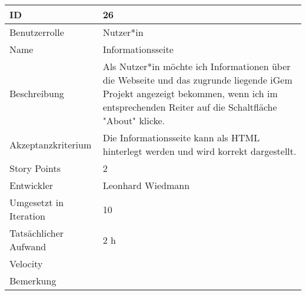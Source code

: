 \begin{tabularx}{\textwidth}{|p{}|X|}
	\hline
	ID & 26\\
	\hline
	Benutzerrolle & Nutzer*in\\
	\hline
	Name & Informationsseite\\
	\hline
	Beschreibung & Als Nutzer*in möchte ich Informationen über die Webseite und das zugrunde liegende iGem Projekt angezeigt bekommen, wenn ich im entsprechenden Reiter auf die Schaltfläche "About" klicke.\\
	\hline
	Akzeptanzkriterium & Die Informationsseite kann als HTML hinterlegt werden und wird korrekt dargestellt.\\
	\hline
	Story Points & 2\\
	\hline
	Entwickler & Leonhard Wiedmann\\
	\hline
	Umgesetzt in Iteration & 10\\
	\hline
	Tatsächlicher Aufwand & 2 h\\
	\hline
	Velocity & \\
	\hline
	Bemerkung & \\
	\hline
\end{tabularx}
\vspace{20pt}
